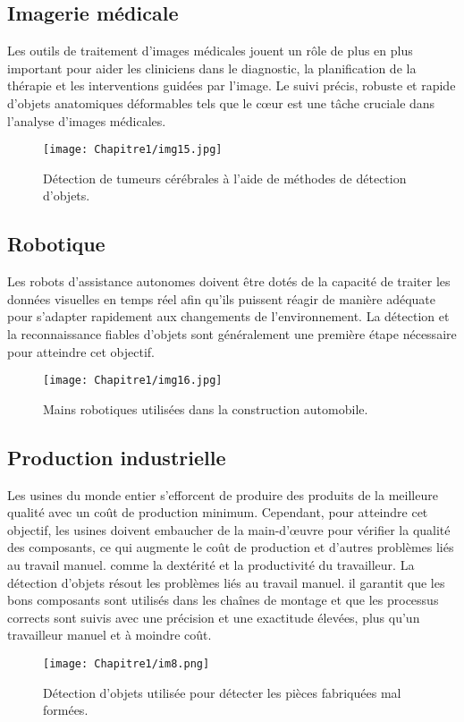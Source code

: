      \subsection{Imagerie médicale}
     Les outils de traitement d'images médicales jouent un rôle de plus en plus important pour aider les cliniciens dans le diagnostic, la planification de la thérapie et les interventions guidées par l'image. Le suivi précis, robuste et rapide d'objets anatomiques déformables tels que le cœur est une tâche cruciale dans l'analyse d'images médicales.
     \begin{figure}[H]
          \centering
          \texttt{[image: Chapitre1/img15.jpg]}
          \caption{Détection de tumeurs cérébrales à l'aide de méthodes de détection d'objets.}
          \label{img15}
          \end{figure}

     \subsection{Robotique}
     Les robots d'assistance autonomes doivent être dotés de la capacité de traiter les données visuelles en temps réel afin qu'ils puissent réagir de manière adéquate pour s'adapter rapidement aux changements de l'environnement. La détection et la reconnaissance fiables d'objets sont généralement une première étape nécessaire pour atteindre cet objectif.
     \begin{figure}[H]
          \centering
          \texttt{[image: Chapitre1/img16.jpg]}
          \caption{Mains robotiques utilisées dans la construction automobile.}
          \label{img16}
          \end{figure}
     
     \subsection{Production industrielle}
     Les usines du monde entier s'efforcent de produire des produits de la
     meilleure qualité avec un coût de production minimum. Cependant, pour
     atteindre cet objectif, les usines doivent embaucher de la main-d'œuvre pour vérifier la qualité des composants, ce qui augmente le coût de production et d'autres problèmes liés au travail manuel. comme la dextérité et la productivité du travailleur. La détection d'objets résout les problèmes liés au travail manuel. il garantit que les bons composants sont utilisés dans les chaînes de montage et que les processus corrects sont suivis avec une précision et une exactitude élevées, plus qu'un travailleur manuel et à moindre coût.
     \begin{figure}[H]
          \centering
          \texttt{[image: Chapitre1/im8.png]}
          \caption{Détection d'objets utilisée pour détecter les pièces fabriquées mal formées.}
          \label{im8}
          \end{figure}
     
